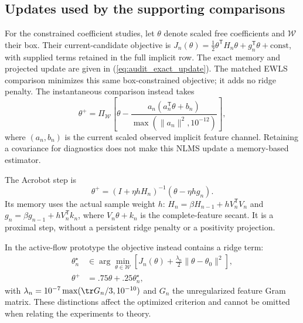 \subsection{Updates used by the supporting comparisons}
For the constrained coefficient studies, let $\theta$ denote scaled free
coefficients and $\mathcal W$ their box. Their current-candidate objective
is $J_n(\theta)=\tfrac12\theta^{\mathsf T}H_n\theta+g_n^{\mathsf T}\theta+
\mathrm{const}$, with supplied terms retained in the full implicit row.
The exact memory and projected update are given in
(\ref{eq:audit_exact_update}). The matched EWLS comparison minimizes this
same box-constrained objective; it adds no ridge penalty. The instantaneous
comparison instead takes
\begin{equation}
 \theta^+=\Pi_{\mathcal W}\!\left[
 \theta-\frac{a_n(a_n^{\mathsf T}\theta+b_n)}
 {\max(\|a_n\|^2,10^{-12})}\right],
 \label{eq:inventory_nlms}
\end{equation}
where $(a_n,b_n)$ is the current scaled observed implicit feature channel.
Retaining a covariance for diagnostics does not make this NLMS update a
memory-based estimator.

The Acrobot step is
\begin{equation}
 \theta^+=(I+\eta hH_n)^{-1}(\theta-\eta h g_n).
 \label{eq:inventory_proximal}
\end{equation}
Its memory uses the actual sample weight $h$:
$H_n=\beta H_{n-1}+hV_n^{\mathsf T}V_n$ and
$g_n=\beta g_{n-1}+hV_n^{\mathsf T}k_n$, where $V_n\theta+k_n$
is the complete-feature secant. It is a proximal step, without a persistent
ridge penalty or a positivity projection.

In the active-flow prototype the objective instead contains a ridge term:
\begin{align}
 \theta_n^\star&\in\arg\min_{\theta\in\mathcal W}
 \left[J_n(\theta)+\frac{\lambda_n}{2}
             \|\theta-\theta_0\|^2\right],\\
 \theta^+&=.75\theta+.25\theta_n^\star,
 \label{eq:inventory_flow_relaxation}
\end{align}
with $\lambda_n=10^{-7}\max(\tr G_n/3,10^{-10})$ and $G_n$ the
unregularized feature Gram matrix. These distinctions affect the optimized
criterion and cannot be omitted when relating the experiments to theory.

